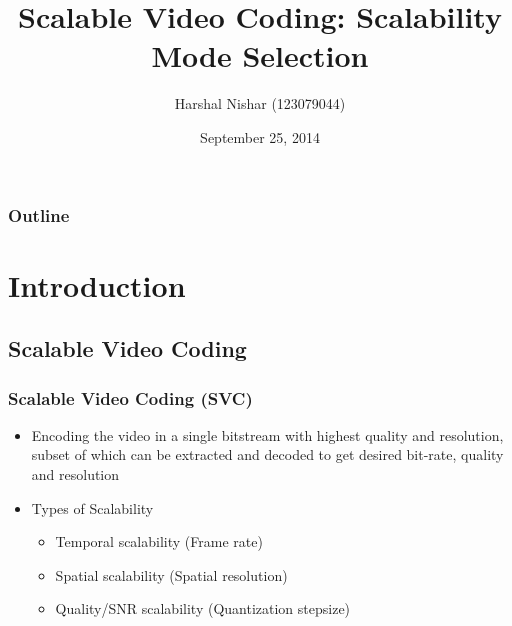 \documentclass{beamer}
\begin{document}
\title{Scalable Video Coding: Scalability Mode Selection}  
\author{Harshal Nishar (123079044) }
\date{September 25, 2014}


\begin{frame}
\titlepage
\end{frame}
\begin{frame}[shrink]\frametitle{Outline}
\tableofcontents
\end{frame} 


\section{Introduction} 

\subsection{Scalable Video Coding}
\begin{frame}\frametitle{Scalable Video Coding (SVC)}
\begin{itemize}
\setlength\itemsep{1.5 em}
\item Encoding the video in a single bitstream with highest quality and resolution, subset of which can be extracted and decoded to get desired bit-rate, quality and resolution
\item Types of Scalability
\begin{itemize}
\setlength\itemsep{0.5 em}
\item Temporal scalability (Frame rate)
\item Spatial scalability (Spatial resolution)
\item Quality/SNR scalability (Quantization stepsize)
\end{itemize}
\end{itemize}
\end{frame}
\end{document}
